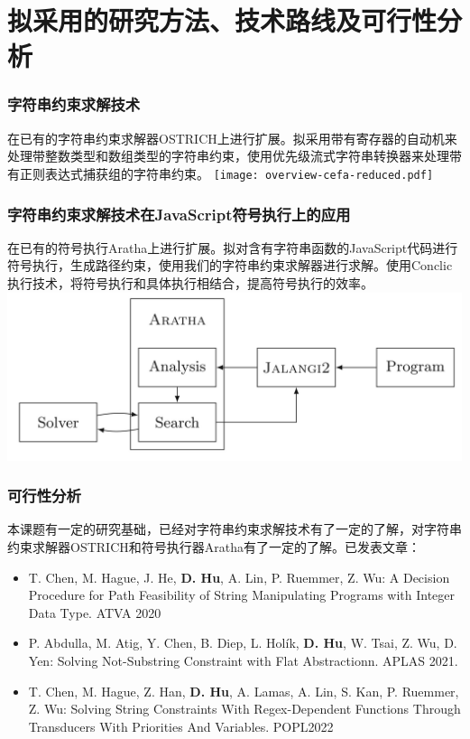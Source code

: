 \documentclass[landscape]{beamer}
\begin{document}
\section{拟采用的研究方法、技术路线及可行性分析}
\begin{frame}
  \frametitle{字符串约束求解技术}
  在已有的字符串约束求解器OSTRICH上进行扩展。拟采用带有寄存器的自动机来处理带整数类型和数组类型的字符串约束，使用优先级流式字符串转换器来处理带有正则表达式捕获组的字符串约束。
  \texttt{[image: overview-cefa-reduced.pdf]}
\end{frame}
\begin{frame}
  \frametitle{字符串约束求解技术在JavaScript符号执行上的应用}
  在已有的符号执行Aratha上进行扩展。拟对含有字符串函数的JavaScript代码进行符号执行，生成路径约束，使用我们的字符串约束求解器进行求解。使用Conclic执行技术，将符号执行和具体执行相结合，提高符号执行的效率。
  \includegraphics[width=\linewidth]{aratha}
\end{frame}
\begin{frame}
  \frametitle{可行性分析}
  本课题有一定的研究基础，已经对字符串约束求解技术有了一定的了解，对字符串约束求解器OSTRICH和符号执行器Aratha有了一定的了解。已发表文章：
  \begin{itemize}
    \item T. Chen, M. Hague, J. He, \textbf{D. Hu}, A. Lin, P. Ruemmer, Z. Wu: A Decision Procedure for Path Feasibility of String Manipulating Programs with Integer Data Type. ATVA 2020
    \item P. Abdulla, M. Atig, Y. Chen, B. Diep, L. Holík, \textbf{D. Hu}, W. Tsai, Z. Wu, D. Yen: Solving Not-Substring Constraint with Flat Abstractionn. APLAS 2021.
    \item T. Chen, M. Hague, Z. Han, \textbf{D. Hu}, A. Lamas, A. Lin, S. Kan, P. Ruemmer, Z. Wu: Solving String Constraints With Regex-Dependent Functions Through Transducers With Priorities And Variables. POPL2022
  \end{itemize}
\end{frame}
\end{document}
